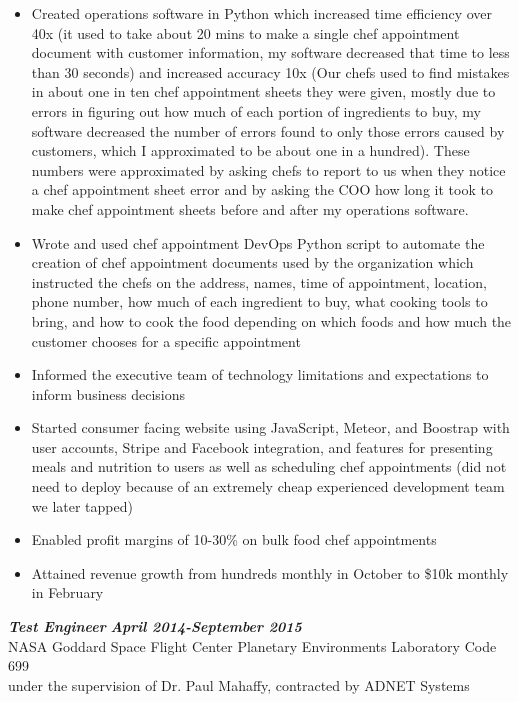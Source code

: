 \documentclass{res}
\begin{document}
\begin{resume}
\begin{itemize}
		\item Created operations software in Python which increased time efficiency over 40x (it used to take about 20 mins to make a single chef appointment document with customer information, my software decreased that time to less than 30 seconds) and increased accuracy 10x (Our chefs used to find mistakes in about one in ten chef appointment sheets they were given, mostly due to errors in figuring out how much of each portion of ingredients to buy, my software decreased the number of errors found to only those errors caused by customers, which I approximated to be about one in a hundred). These numbers were approximated by asking chefs to report to us when they notice a chef appointment sheet error and by asking the COO how long it took to make chef appointment sheets before and after my operations software.
		\item Wrote and used chef appointment DevOps Python script to automate the creation of chef appointment documents used by the organization which instructed the chefs on the address, names, time of appointment, location, phone number, how much of each ingredient to buy, what cooking tools to bring, and how to cook the food depending on which foods and how much the customer chooses for a specific appointment
		\item Informed the executive team of technology limitations and expectations to inform business decisions
		\item Started consumer facing website using JavaScript, Meteor, and Boostrap with user accounts, Stripe and Facebook integration, and features for presenting meals and nutrition to users as well as scheduling chef appointments (did not need to deploy because of an extremely cheap experienced development team we later tapped)
                \item Enabled profit margins of 10-30\% on bulk food chef appointments
		\item Attained revenue growth from hundreds monthly in October to \$10k monthly in February
                \end{itemize}
	{\bfseries {\em Test Engineer}}  \hfill  {\bfseries{\em April 2014-September 2015}}\\
		NASA Goddard Space Flight Center Planetary Environments Laboratory Code 699\\
                under the supervision of Dr. Paul Mahaffy, contracted by ADNET Systems
                \begin{itemize}  \itemsep -2pt %

\end{itemize}
\end{resume}
\end{document}
